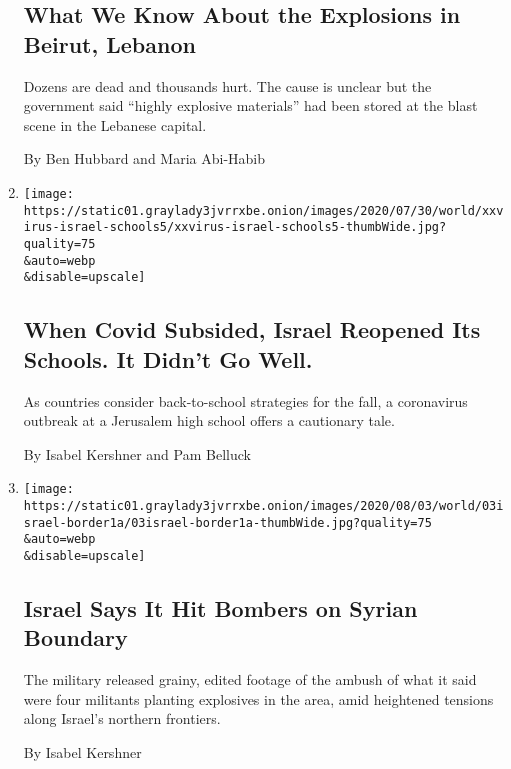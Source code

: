 \begin{enumerate}
  \hypertarget{what-we-know-about-the-explosions-in-beirut-lebanon}{%
  \subsection{What We Know About the Explosions in Beirut,
  Lebanon}\label{what-we-know-about-the-explosions-in-beirut-lebanon}}

  Dozens are dead and thousands hurt. The cause is unclear but the
  government said ``highly explosive materials'' had been stored at the
  blast scene in the Lebanese capital.

  By Ben Hubbard and Maria Abi-Habib
\item
  \href{/2020/08/04/world/middleeast/coronavirus-israel-schools-reopen.html}{}

  \texttt{[image: https://static01.graylady3jvrrxbe.onion/images/2020/07/30/world/xxvirus-israel-schools5/xxvirus-israel-schools5-thumbWide.jpg?quality=75\\\&auto=webp\\\&disable=upscale]}

  \hypertarget{when-covid-subsided-israel-reopened-its-schools-it-didnt-go-well}{%
  \subsection{When Covid Subsided, Israel Reopened Its Schools. It
  Didn't Go
  Well.}\label{when-covid-subsided-israel-reopened-its-schools-it-didnt-go-well}}

  As countries consider back-to-school strategies for the fall, a
  coronavirus outbreak at a Jerusalem high school offers a cautionary
  tale.

  By Isabel Kershner and Pam Belluck
\item
  \href{/2020/08/03/world/middleeast/israel-syria-border.html}{}

  \texttt{[image: https://static01.graylady3jvrrxbe.onion/images/2020/08/03/world/03israel-border1a/03israel-border1a-thumbWide.jpg?quality=75\\\&auto=webp\\\&disable=upscale]}

  \hypertarget{israel-says-it-hit-bombers-on-syrian-boundary}{%
  \subsection{Israel Says It Hit Bombers on Syrian
  Boundary}\label{israel-says-it-hit-bombers-on-syrian-boundary}}

  The military released grainy, edited footage of the ambush of what it
  said were four militants planting explosives in the area, amid
  heightened tensions along Israel's northern frontiers.

  By Isabel Kershner
\end{enumerate}

